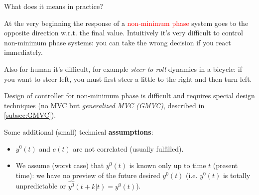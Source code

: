 \begin{remark}
    What does it means in practice? 

    \begin{figure}[H]
        \centering
    \end{figure}

    At the very beginning the response of a \textcolor{red}{non-minimum phase} system goes to the opposite direction w.r.t. the final value. Intuitively it's very difficult to control non-minimum phase systems: you can take the wrong decision if you react immediately.

    Also for human it's difficult, for example \emph{steer to roll} dynamics in a bicycle: if you want to steer left, you must first steer a little to the right and then turn left.

    Design of controller for non-minimum phase is difficult and requires special design techniques (no MVC but \emph{generalized MVC (GMVC)}, described in \ref{subsec:GMVC}).
\end{remark}

Some additional (small) technical \textbf{assumptions}:
\begin{itemize}
    \item $y^0(t)$ and $e(t)$ are not correlated (usually fulfilled).
    \item We assume (worst case) that $y^0(t)$ is known only up to time $t$ (present time): we have no preview of the future desired $y^0(t)$ (i.e. $y^0(t)$ is totally unpredictable or $\hat{y^0}(t+k|t) = y^0(t)$).
\end{itemize}

